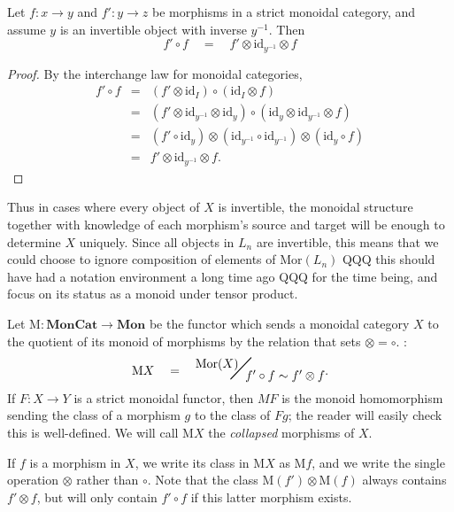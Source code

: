 \documentclass{amsbook} %
\newcommand{\mb}{\mathbf}
\newcommand{\bigquotient}[2]{ \raisebox{0.75\height}{$#1$} \mkern-12mu\scalebox{2}{$\diagup$}\mkern-10mu \raisebox{-0.5\height}{$#2$} }
\newcommand{\mon}{\ensuremath{\mb{Mon}}}
\newcommand{\moncat}{\ensuremath{\mb{MonCat}}}
\numberwithin{section}{chapter}
\begin{document}
\begin{lem} \label{tenscomp} Let $f: x \to y$ and $f': y \to z$ be morphisms in a strict monoidal category, and assume $y$ is an invertible object with inverse $y^{-1}$. Then
\[ f' \circ f \quad = \quad f' \otimes \mathrm{id}_{y^{-1}} \otimes f \]
\end{lem}
\begin{proof}
By the interchange law for monoidal categories,
\[\begin{array}{rll} 
			f' \circ f & = & (f' \otimes \mathrm{id}_I) \circ (\mathrm{id}_I \otimes f) \\
			& = & (f' \otimes \mathrm{id}_{y^{-1}} \otimes \mathrm{id}_y) \circ (\mathrm{id}_y \otimes \mathrm{id}_{y^{-1}} \otimes f) \\
			& = & (f' \circ \mathrm{id}_y) \otimes (\mathrm{id}_{y^{-1}} \circ \mathrm{id}_{y^{-1}}) \otimes (\mathrm{id}_y \circ f) \\
			& = & f' \otimes \mathrm{id}_{y^{-1}} \otimes f .
		\end{array}
\]
\end{proof} 

Thus in cases where every object of $X$ is invertible, the monoidal structure together with knowledge of each morphism's source and target will be enough to determine $X$ uniquely. Since all objects in $L_n$ are invertible, this means that we could choose to ignore composition of elements of $\mathrm{Mor}(L_n)$ QQQ this should have had a notation environment a long time ago QQQ for the time being, and focus on its status as a monoid under tensor product.



\begin{Defi} Let $\mathrm{M} : \moncat \to \mon$ be the functor which sends a monoidal category $X$ to the quotient of its monoid of morphisms by the relation that sets $\otimes = \circ$. :
\[ \mathrm{M}X \quad = \quad \bigquotient{\mathrm{Mor}(X)}{f' \circ f \sim f' \otimes f}.\]
If $F:X \to Y$ is a strict monoidal functor, then $MF$ is the monoid homomorphism sending the class of a morphism $g$ to the class of $Fg$; the reader will easily check this is well-defined. We will call $\mathrm{M}X$ the \emph{collapsed} morphisms of $X$.



\end{Defi}

\begin{nota}
If $f$ is a morphism in $X$, we write its class in $\mathrm{M}X$ as $\mathrm{M}f$, and we write the single operation $\otimes$ rather than $\circ$. Note that the class $\mathrm{M}(f') \otimes \mathrm{M}(f)$ always contains $f' \otimes f$, but will only contain $f' \circ f$ if this latter morphism exists.
\end{nota}
\end{document}
